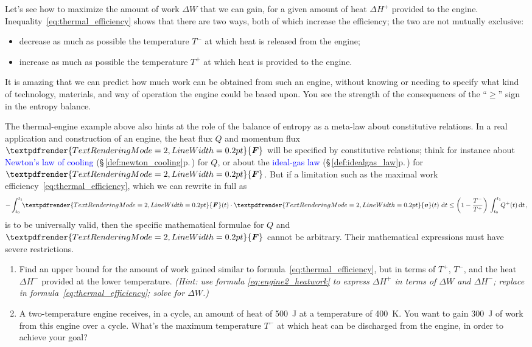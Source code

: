 \documentclass[a4paper,12pt,%
onecolumn,oneside,%
british%
]{memoir}
\renewcommand*{\bm}[1]{\textpdfrender{TextRenderingMode=2,LineWidth=0.2pt}{\boldsymbol{#1}}}
\newcommand*{\di}{\mathrm{d}}%
\newcommand*{\incr}{\Delta}%
\renewcommand*{\|}[1][]{\nonscript\:#1\vert\nonscript\:\mathopen{}}
\newcommand*{\sect}{\S}%
\renewcommand*{\autoref}[3][\sect\,\ref]{\textcolor{blue}{#3} {\color{blue}\scriptsize(\faIcon[regular]{eye}\;#1{#2}\;p.\,\pageref{#2})}}
\newcommand*{\yv}{\bm{v}}
\newcommand*{\yti}{t_{0}}
\newcommand*{\ytf}{t_{1}}
\newcommand*{\dt}{\di t}
\newcommand*{\yQ}{Q}%
\newcommand*{\yQp}{\yQ^{+}}%
\newcommand*{\yhep}{\incr H^{+}}%
\newcommand*{\yhem}{\incr H^{-}}%
\newcommand*{\yW}{\incr W}%
\newcommand*{\yF}{\bm{F}}
\newcommand*{\yT}{T}%
\newcommand*{\yTp}{\yT^{+}}%
\newcommand*{\yTm}{\yT^{-}}%
\begin{document}
Let's see how to maximize the amount of work $\yW$ that we can gain, for a given amount of heat $\yhep$ provided to the engine. Inequality~\eqref{eq:thermal_efficiency} shows that there are two ways, both of which increase the efficiency; the two are not mutually exclusive:
\begin{itemize}
\item decrease as much as possible the temperature $\yTm$ at which heat is released from the engine;
\item increase as much as possible the temperature $\yTp$ at which heat is provided to the engine.
\end{itemize}

\medskip

It is amazing that we can predict how much work can be obtained from such an engine, without knowing or needing to specify what kind of technology, materials, and way of operation the engine could be based upon. You see the strength of the consequences of the \enquote{$\ge$} sign in the entropy balance.

The thermal-engine example above also hints at the role of the balance of entropy as a meta-law about constitutive relations. In a real application and construction of an engine, the heat flux $\yQ$ and momentum flux $\yF$ will be specified by constitutive relations; think for instance about \autoref{def:newton_cooling}{Newton's law of cooling} for $\yQ$, or about the \autoref{def:idealgas_law}{ideal-gas law} for $\yF$. But if a limitation such as the maximal work efficiency~\eqref{eq:thermal_efficiency}, which we can rewrite in full as
\begin{equation*}
  -\int_{\yti}^{\ytf}\!\!\yF(t)\cdot\yv(t)\ \dt
  \le
  \biggl(1-\frac{\yTm}{\yTp}\biggr)\,
  \int_{\yti}^{\ytf}\!\!\yQp(t)\,\dt \,,
\end{equation*}
is to be universally valid, then the specific mathematical formulae for $\yQ$ and $\yF$ cannot be arbitrary. Their mathematical expressions must have severe restrictions.


\begin{exercise}
  \begin{enumerate}[exerc]
  \item Find an upper bound for the amount of work gained similar to formula~\eqref{eq:thermal_efficiency}, but in terms of $\yTp$, $\yTm$, and the heat $\yhem$ provided at the lower temperature. \emph{(Hint: use formula \eqref{eq:engine2_heatwork} to express $\yhep$ in terms of $\yW$ and $\yhem$; replace in formula~\eqref{eq:thermal_efficiency}; solve for $\yW$.)}

  \item A two-temperature engine receives, in a cycle, an amount of heat of \qty{500}{J} at a temperature of \qty{400}{K}. You want to gain \qty{300}{J} of work from this engine over a cycle. What's the maximum temperature $\yTm$ at which heat can be discharged from the engine, in order to achieve your goal?
  \end{enumerate}
\end{exercise}
\end{document}

